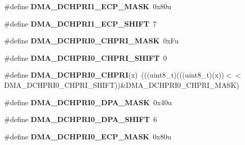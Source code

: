 \begin{DoxyCompactItemize}
\item 
\#define {\bfseries D\+M\+A\+\_\+\+D\+C\+H\+P\+R\+I1\+\_\+\+E\+C\+P\+\_\+\+M\+A\+SK}~0x80u\hypertarget{group__DMA__Register__Masks_ga14d7f4364a392f0b23a4effdf3f04f4a}{}\label{group__DMA__Register__Masks_ga14d7f4364a392f0b23a4effdf3f04f4a}

\item 
\#define {\bfseries D\+M\+A\+\_\+\+D\+C\+H\+P\+R\+I1\+\_\+\+E\+C\+P\+\_\+\+S\+H\+I\+FT}~7\hypertarget{group__DMA__Register__Masks_ga404b79e3e633ecb770dbf283d8b5fccd}{}\label{group__DMA__Register__Masks_ga404b79e3e633ecb770dbf283d8b5fccd}

\item 
\#define {\bfseries D\+M\+A\+\_\+\+D\+C\+H\+P\+R\+I0\+\_\+\+C\+H\+P\+R\+I\+\_\+\+M\+A\+SK}~0x\+Fu\hypertarget{group__DMA__Register__Masks_ga5d1b7f82e1bbdb7b8e2f15cb88712022}{}\label{group__DMA__Register__Masks_ga5d1b7f82e1bbdb7b8e2f15cb88712022}

\item 
\#define {\bfseries D\+M\+A\+\_\+\+D\+C\+H\+P\+R\+I0\+\_\+\+C\+H\+P\+R\+I\+\_\+\+S\+H\+I\+FT}~0\hypertarget{group__DMA__Register__Masks_gae28baaa3d91720906d6880186c20f7c0}{}\label{group__DMA__Register__Masks_gae28baaa3d91720906d6880186c20f7c0}

\item 
\#define {\bfseries D\+M\+A\+\_\+\+D\+C\+H\+P\+R\+I0\+\_\+\+C\+H\+P\+RI}(x)~(((uint8\+\_\+t)(((uint8\+\_\+t)(x))$<$$<$D\+M\+A\+\_\+\+D\+C\+H\+P\+R\+I0\+\_\+\+C\+H\+P\+R\+I\+\_\+\+S\+H\+I\+FT))\&D\+M\+A\+\_\+\+D\+C\+H\+P\+R\+I0\+\_\+\+C\+H\+P\+R\+I\+\_\+\+M\+A\+SK)\hypertarget{group__DMA__Register__Masks_ga64abfb2d5a1388fd8e110117715685a6}{}\label{group__DMA__Register__Masks_ga64abfb2d5a1388fd8e110117715685a6}

\item 
\#define {\bfseries D\+M\+A\+\_\+\+D\+C\+H\+P\+R\+I0\+\_\+\+D\+P\+A\+\_\+\+M\+A\+SK}~0x40u\hypertarget{group__DMA__Register__Masks_gad746dcaccbad5591a4c76f397bced727}{}\label{group__DMA__Register__Masks_gad746dcaccbad5591a4c76f397bced727}

\item 
\#define {\bfseries D\+M\+A\+\_\+\+D\+C\+H\+P\+R\+I0\+\_\+\+D\+P\+A\+\_\+\+S\+H\+I\+FT}~6\hypertarget{group__DMA__Register__Masks_ga58cc686267da58f32d00143ba6aa5044}{}\label{group__DMA__Register__Masks_ga58cc686267da58f32d00143ba6aa5044}

\item 
\#define {\bfseries D\+M\+A\+\_\+\+D\+C\+H\+P\+R\+I0\+\_\+\+E\+C\+P\+\_\+\+M\+A\+SK}~0x80u\hypertarget{group__DMA__Register__Masks_ga691357e0e7e7aea1147f26d3e7b39ad7}{}\label{group__DMA__Register__Masks_ga691357e0e7e7aea1147f26d3e7b39ad7}


\end{DoxyCompactItemize}
